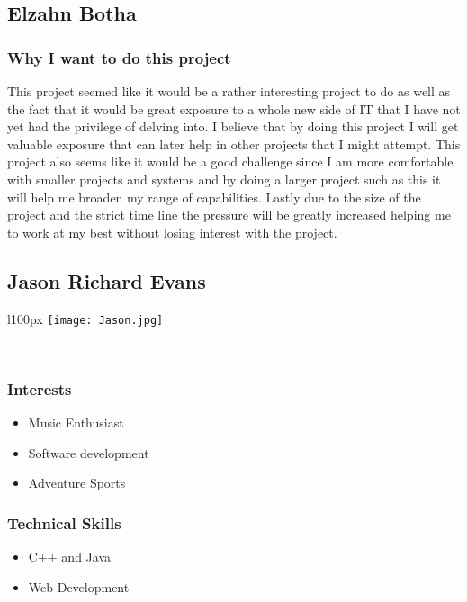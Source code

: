 
\subsection{Elzahn Botha}

\subsubsection{Why I want to do this project}
This project seemed like it would be a rather interesting project to do as well as the fact that it would be great exposure to a whole new side of IT that I have not yet had the privilege of delving into. I believe that by doing this project I will get valuable exposure that can later help in other projects that I might attempt. This project also seems like it would be a good challenge since I am more comfortable with smaller projects and systems and by doing a larger project such as this it will help me broaden my range of capabilities. Lastly due to the size of the project and the strict time line the pressure will be greatly increased helping me to work at my best without losing interest with the project. 

\pagebreak
\subsection{Jason Richard Evans}
\begin{wrapfigure}[5]{l}{100px}
\vspace{10pt}
\texttt{[image: Jason.jpg]}
\end{wrapfigure}

\textcolor{white}{.}
\subsubsection{Interests}
\begin{itemize}
	\item{Music Enthusiast}
	\item{Software development}
	\item{Adventure Sports}
\end{itemize}
\subsubsection{Technical Skills}
\begin{itemize}
	\item{C++ and Java}
	\item{Web Development}
\end{itemize}
